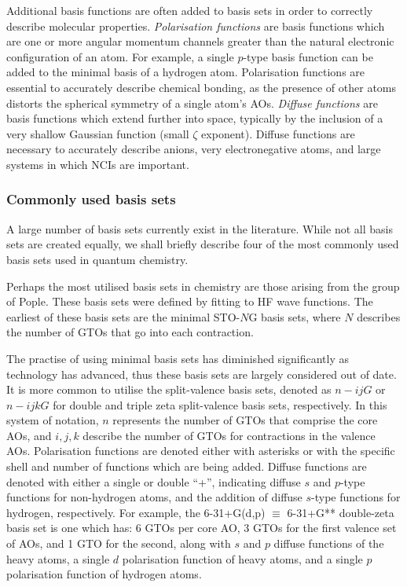Additional basis functions are often added to basis sets in order to correctly describe molecular properties. \emph{Polarisation functions} are basis functions which are one or more angular momentum channels greater than the natural electronic configuration of an atom. For example, a single $p$-type basis function can be added to the minimal basis of a hydrogen atom. Polarisation functions are essential to accurately describe chemical bonding, as the presence of other atoms distorts the spherical symmetry of a single atom's AOs.\cite{Szabo1996} \emph{Diffuse functions} are basis functions which extend further into space, typically by the inclusion of a very shallow Gaussian function (small $\zeta$ exponent). Diffuse functions are necessary to accurately describe anions, very electronegative atoms, and large systems in which NCIs are important.

\subsubsection{Commonly used basis sets}

A large number of basis sets currently exist in the literature.\cite{Jensen2012} While not all basis sets are created equally, we shall briefly describe four of the most commonly used basis sets used in quantum chemistry. 

\vspace{3mm}
\vspace{1mm}

Perhaps the most utilised basis sets in chemistry are those arising from the group of Pople.\cite{Hehre1969} These basis sets were defined by fitting to HF wave functions. The earliest of these basis sets are the minimal STO-$N$G basis sets, where $N$ describes the number of GTOs that go into each contraction.

The practise of using minimal basis sets has diminished significantly as technology has advanced, thus these basis sets are largely considered out of date. It is more common to utilise the split-valence basis sets, denoted as $n-ijG$ or $n-ijkG$ for double and triple zeta split-valence basis sets, respectively. In this system of notation, $n$ represents the number of GTOs that comprise the core AOs, and $i, j, k$ describe the number of GTOs for contractions in the valence AOs. Polarisation functions are denoted either with asterisks or with the specific shell and number of functions which are being added. Diffuse functions are denoted with either a single or double ``+'', indicating diffuse $s$ and $p$-type functions for non-hydrogen atoms, and the addition of diffuse $s$-type functions for hydrogen, respectively. For example, the 6-31+G(d,p) $\equiv$ 6-31+G** double-zeta basis set is one which has: 6 GTOs per core AO, 3 GTOs for the first valence set of AOs, and 1 GTO for the second, along with $s$ and $p$ diffuse functions of the heavy atoms, a single $d$ polarisation function of heavy atoms, and a single $p$ polarisation function of hydrogen atoms.

